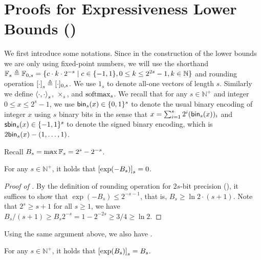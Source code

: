 \section{Proofs for Expressiveness Lower Bounds ()}\label{appsec:proofs}

\newcommand{\interleave}[2]{{#1}^\frown{#2}}
We first introduce some notations. Since in the construction of the lower bounds we are only using fixed-point numbers, we will use the shorthand $\mathbb{F}_{s}\triangleq \mathbb{F}_{0,s}=\{c\cdot k\cdot 2^{-s}\mid c\in \{-1,1\}, 0\le k\le 2^{2s}-1, k\in\mathbb{N}\}$ and rounding operation $\left[\cdot\right]_s \triangleq[\cdot]_{0,s}$. We use $1_s$ to denote all-one vectors of length $s$. Similarly we define $\left\langle \cdot,\cdot \right\rangle_s$, $\times_s$, and $\mathrm{softmax}_s$. We recall that for any $s\in \mathbb{N}^+$ and integer $0\le x\le 2^s-1$, we use $\mathsf{bin}_s(x)\in\{0,1\}^s$ to denote the usual binary encoding of integer $x$ using $s$ binary bits in the sense that $x = \sum_{i=1}^s 2^i (\mathsf{bin}_s(x))_i$ and $\mathsf{sbin}_s(x)\in\{-1,1\}^s$ to denote the signed binary encoding, which is $2\mathsf{bin}_s(x)-(1,\ldots,1)$. 



%

Recall $B_s = \max \mathbb{F}_s = 2^s-2^{-s}$.
\begin{lemma}\label{lem:exp_rounding}
	For any $s\in\mathbb{N}^+$, it holds that $\left[\exp(-B_s)\right]_s = 0$.
\end{lemma}
\begin{proof}[Proof of ]
	By the definition of rounding operation for $2s$-bit precision (), it suffices to show that $\exp(-B_s)\le 2^{-s-1}$, that is, $B_s \ge \ln 2\cdot (s+1)$. Note that $2^s\ge s+1$ for all $s\ge 1$, we have $B_s/(s+1)\ge B_s2^{-s} =1-2^{-2s}\ge 3/4 \ge \ln 2$.
\end{proof}

Using the same argument above, we also have .
\begin{lemma}\label{lem:exp_rounding_up}
	For any $s\in\mathbb{N}^+$, it holds that $\left[\exp(B_s)\right]_s = B_s$.
\end{lemma}

